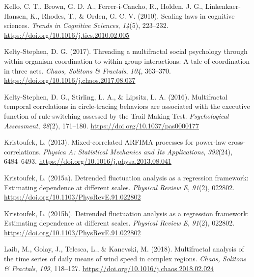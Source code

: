 \documentclass[
  man]{apa6}
\newlength{\cslhangindent}
\newlength{\cslentryspacingunit} %
\newenvironment{CSLReferences}[2] %
 {%
  \setlength{\parindent}{0pt}
  \ifodd #1
  \let\oldpar\par
  \def\par{\hangindent=\cslhangindent\oldpar}
  \fi
  \setlength{\parskip}{#2\cslentryspacingunit}
 }%
 {}
\begin{document}
\begin{CSLReferences}{1}{0}
\leavevmode{}%
Kello, C. T., Brown, G. D. A., Ferrer-i-Cancho, R., Holden, J. G., Linkenkaer-Hansen, K., Rhodes, T., \& Orden, G. C. V. (2010). Scaling laws in cognitive sciences. \emph{Trends in Cognitive Sciences}, \emph{14}(5), 223--232. \url{https://doi.org/10.1016/j.tics.2010.02.005}

\leavevmode{}%
Kelty-Stephen, D. G. (2017). Threading a multifractal social psychology through within-organism coordination to within-group interactions: {A} tale of coordination in three acts. \emph{Chaos, Solitons \& Fractals}, \emph{104}, 363--370. \url{https://doi.org/10.1016/j.chaos.2017.08.037}

\leavevmode{}%
Kelty-Stephen, D. G., Stirling, L. A., \& Lipsitz, L. A. (2016). Multifractal temporal correlations in circle-tracing behaviors are associated with the executive function of rule-switching assessed by the {Trail} {Making} {Test}. \emph{Psychological Assessment}, \emph{28}(2), 171--180. \url{https://doi.org/10.1037/pas0000177}

\leavevmode{}%
Kristoufek, L. (2013). Mixed-correlated {ARFIMA} processes for power-law cross-correlations. \emph{Physica A: Statistical Mechanics and Its Applications}, \emph{392}(24), 6484--6493. \url{https://doi.org/10.1016/j.physa.2013.08.041}

\leavevmode{}%
Kristoufek, L. (2015a). Detrended fluctuation analysis as a regression framework: {Estimating} dependence at different scales. \emph{Physical Review E}, \emph{91}(2), 022802. \url{https://doi.org/10.1103/PhysRevE.91.022802}

\leavevmode{}%
Kristoufek, L. (2015b). Detrended fluctuation analysis as a regression framework: Estimating dependence at different scales. \emph{Physical Review E}, \emph{91}(2), 022802. \url{https://doi.org/10.1103/PhysRevE.91.022802}

\leavevmode{}%
Laib, M., Golay, J., Telesca, L., \& Kanevski, M. (2018). Multifractal analysis of the time series of daily means of wind speed in complex regions. \emph{Chaos, Solitons \& Fractals}, \emph{109}, 118--127. \url{https://doi.org/10.1016/j.chaos.2018.02.024}


\end{CSLReferences}
\end{document}
